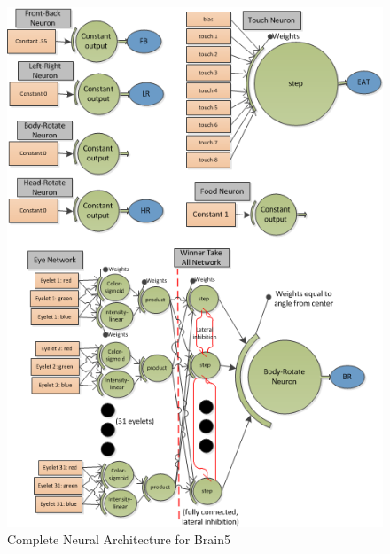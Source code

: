 \documentclass[a4paper,11pt]{article}
\begin{document}
\begin{figure}
\begin{center}
  \includegraphics[scale=1.0]{img/brain5complete.png}
  \caption{Complete Neural Architecture for Brain5 }
  \label{fig:brain5complete}
\end{center}
\end{figure}
\end{document}
